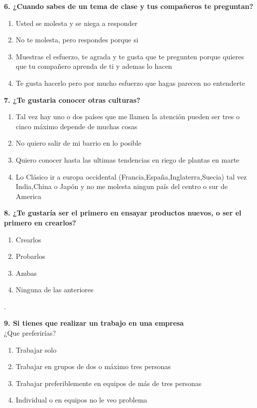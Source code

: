 \documentclass{article}
\begin{document}
 \textbf{6. ¿Cuando sabes de un tema de clase y tus compañeros te preguntan?}
\begin{enumerate}[label=(\Alph*)]
\item Usted se molesta y se niega a responder
\item No te molesta, pero respondes porque si
\item Muestras el esfuerzo, te agrada y te gusta que te pregunten porque quieres que tu compañero aprenda de ti y ademas lo hacen
\item Te gusta hacerlo pero por mucho esfuerzo que hagas parecen no entenderte 
 \end{enumerate}
 
\textbf{7. ¿Te gustaria conocer otras culturas?}
\begin{enumerate}[label=(\Alph*)]
\item Tal vez hay uno o dos países que me llamen la atención pueden ser tres o cinco máximo depende de muchas cosas
\item No quiero salir de mi barrio en lo posible
\item Quiero conocer hasta las ultimas tendencias en riego de plantas en marte
\item Lo Clásico ir a europa occidental (Francia,España,Inglaterra,Suecia) tal vez India,China o Japón y no me molesta ningun país del centro o sur de America 
 \end{enumerate}


\textbf{8. ¿Te gustaría ser el primero en ensayar productos nuevos, o ser el primero en crearlos?}

\begin{enumerate}[label=(\Alph*)]
\item Crearlos
\item Probarlos 
\item Ambas
\item Ninguna de las anteriores
\end{enumerate}.

\textbf{9. Si tienes que realizar un trabajo en una empresa }\\ 
¿Que preferirías?
\begin{enumerate}[label=(\Alph*)] 
\item Trabajar solo
\item Trabajar en grupos de dos o máximo tres personas
\item Trabajar preferiblemente en equipos de más de tres personas
\item Individual o en equipos no le veo problema
\end{enumerate}
\end{document}

